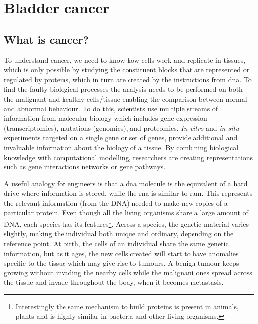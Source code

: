 
\section{Bladder cancer} \label{s:lit:biology}

\vspace{3mm}
\vspace{3mm}

\subsection{What is cancer?}

To understand cancer, we need to know how cells work and replicate in tissues, which is only possible by studying the constituent blocks that are represented or regulated by proteins, which in turn are created by the instructions from \acrfull{dna}. To find the faulty biological processes the analysis needs to be performed on both the malignant and healthy cells/tissue enabling the comparison between normal and abnormal behaviour. To do this, scientists use multiple streams of information from molecular biology which includes gene expression (transcriptomics), mutations (genomics), and proteomics. \textit{In vitro} and \textit{in situ} experiments targeted on a single gene or set of genes, provide additional and invaluable information about the biology of a tissue. By combining biological knowledge with computational modelling, researchers are creating representations such as gene interactions networks or gene pathways. 

A useful analogy for engineers is that a \acrshort{dna} molecule is the equivalent of a hard drive where information is stored, while the \acrfull{rna} is similar to \acrfull{ram}. This represents the relevant information (from the DNA) needed to make new copies of a particular protein. Even though all the living organisms share a large amount of DNA, each species has its features\footnote{Interestingly the same mechanism to build proteins is present in animals, plants and is highly similar in bacteria and other living organisms.}. Across a species, the genetic material varies slightly, making the individual both unique and ordinary, depending on the reference point. At birth, the cells of an individual share the same genetic information, but as it ages, the new cells created will start to have anomalies specific to the tissue which may give rise to tumours. A benign tumour keeps growing without invading the nearby cells while the malignant ones spread across the tissue and invade throughout the body, when it becomes metastasis. 

